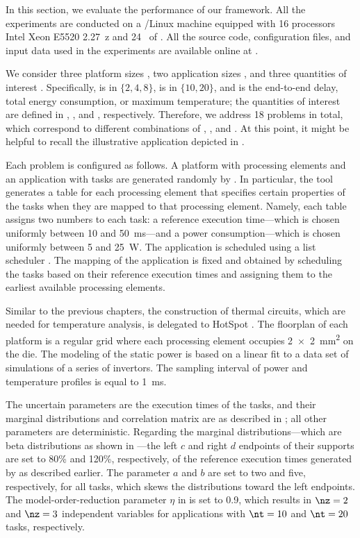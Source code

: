 In this section, we evaluate the performance of our framework. All the
experiments are conducted on a /Linux machine equipped with 16
processors Intel Xeon E5520 2.27~z and 24~ of . All the
source code, configuration files, and input data used in the experiments are
available online at \cite{eslab2017a}.

We consider three platform sizes \np, two application sizes \nt, and three
quantities of interest \g. Specifically, \np is in $\{ 2, 4, 8 \}$, \nt is in
$\{ 10, 20 \}$, and \g is the end-to-end delay, total energy consumption, or
maximum temperature; the quantities of interest are defined in
, , and ,
respectively. Therefore, we address 18 problems in total, which correspond to
different combinations of \np, \nt, and \g. At this point, it might be helpful
to recall the illustrative application depicted in .

Each problem is configured as follows. A platform with \np processing elements
and an application with \nt tasks are generated randomly by 
\cite{dick1998}. In particular, the tool generates a table for each processing
element that specifies certain properties of the tasks when they are mapped to
that processing element. Namely, each table assigns two numbers to each task: a
reference execution time---which is chosen uniformly between 10 and 50~ms---and
a power consumption---which is chosen uniformly between 5 and 25~W. The
application is scheduled using a list scheduler \cite{adam1974}. The mapping of
the application is fixed and obtained by scheduling the tasks based on their
reference execution times and assigning them to the earliest available
processing elements.

Similar to the previous chapters, the construction of thermal  circuits,
which are needed for temperature analysis, is delegated to HotSpot
\cite{skadron2003}. The floorplan of each platform is a regular grid where each
processing element occupies 2~×~2~mm\textsuperscript{2} on the die. The modeling
of the static power is based on a linear fit to a data set of 
simulations of a series of  invertors. The sampling interval of power
and temperature profiles is equal to 1~ms.

The uncertain parameters \vu are the execution times of the tasks, and their
marginal distributions and correlation matrix are as described in
; all other parameters are deterministic. Regarding the
marginal distributions---which are beta distributions as shown in
---the left $c$ and right $d$ endpoints of their
supports are set to 80\% and 120\%, respectively, of the reference execution
times generated by  as described earlier. The parameter $a$ and $b$ are
set to two and five, respectively, for all tasks, which skews the distributions
toward the left endpoints. The model-order-reduction parameter $\eta$ in
 is set to 0.9, which results in $\nz = 2$ and $\nz
= 3$ independent variables for applications with $\nt = 10$ and $\nt = 20$
tasks, respectively.

